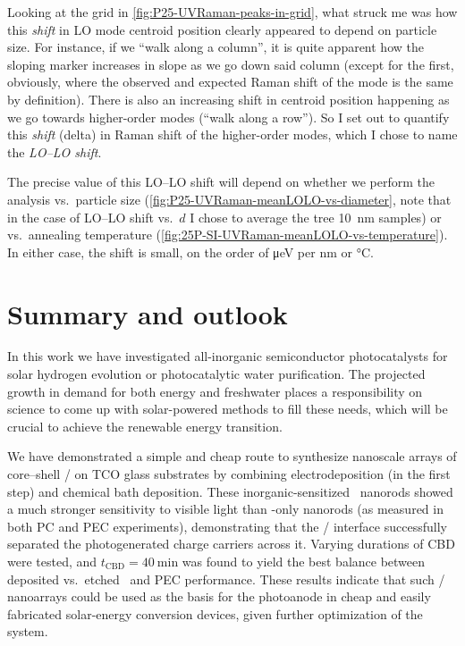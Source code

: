 \documentclass[draft,webedition,openright,titles,swedish,english]{LuaUUThesis}\usepackage[]{graphicx}\usepackage[]{xcolor}
\newcommand{\vs}{vs.}
\begin{document}
Looking at the grid in \cref{fig:P25-UVRaman-peaks-in-grid}, what struck me was
how this \emph{shift} in LO mode centroid position clearly appeared to depend
on particle size. For instance, if we \enquote{walk along a column}, it is
quite apparent how the sloping marker increases in slope as we go down said
column (except for the first, obviously, where the observed and expected Raman shift
of the mode is the same by definition).
There is also an increasing shift in centroid position happening as we go towards
higher-order modes (\enquote{walk along a row}).
So I set out to quantify this \emph{shift} (delta) in Raman shift of the higher-order modes,
which I chose to name the \emph{LO--LO shift}.


The precise value of this LO--LO shift will depend on whether we perform the analysis
\vs\ particle size (\cref{fig:P25-UVRaman-meanLOLO-vs-diameter}, note that in
the case of LO--LO shift \vs\ $d$ I chose to average the tree \qty{10}{\nm} samples)
or \vs\ annealing temperature (\cref{fig:25P-SI-UVRaman-meanLOLO-vs-temperature}).
In either case, the shift is small, on the order of \unit{\micro\eV} per \unit{\nm}
or \unit{\celsius}.




%

\chapter{Summary and outlook}
\label{ch:summary}

In this work we have investigated all-inorganic semiconductor photocatalysts
for solar hydrogen evolution or photocatalytic water purification.
The projected growth in demand for both energy and freshwater places a responsibility
on science to come up with solar-powered methods to fill these needs, which
will be crucial to achieve the renewable energy transition.


We have demonstrated a simple and cheap route to synthesize nanoscale arrays of core--shell
\ZnO/ on \gls{TCO} glass substrates by combining electrodeposition (in the first step)
and chemical bath deposition.
These inorganic-sensitized \ZnO\ nanorods showed a much stronger sensitivity to
visible light than \ZnO-only nanorods (as measured in both \gls{PC} and \gls{PEC} experiments),
demonstrating that the \ZnO/ interface successfully separated
the photogenerated charge carriers across it.
Varying durations of \gls{CBD} were tested, and $t_\mathrm{CBD}=\qty{40}{\minute}$
was found to yield the best balance between deposited  \vs\ etched \ZnO\
and \gls{PEC} performance.
These results indicate that such \ZnO/ nanoarrays could be used as the basis
for the photoanode in cheap and easily fabricated solar-energy conversion devices,
given further optimization of the system.
\end{document}
